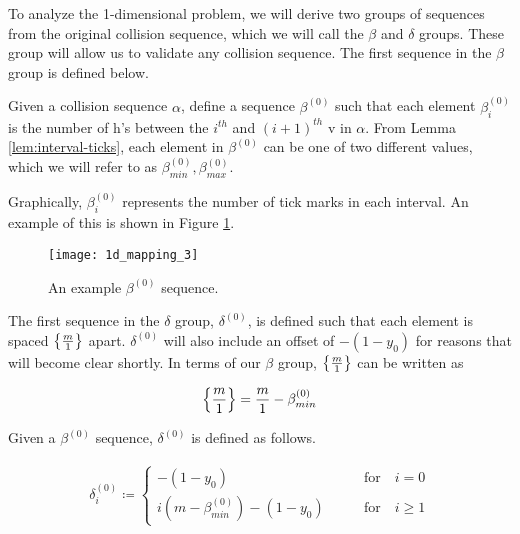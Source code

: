 
To analyze the 1-dimensional problem, we will derive two groups of sequences from the original collision sequence, which we will call the $\beta$ and $\delta$ groups. These group will allow us to validate any collision sequence. The first sequence in the $\beta$ group is defined below.

\begin{definition}
	Given a collision sequence $\alpha$, define a sequence $\beta^{(0)}$ such that each element $\beta^{(0)}_i$ is the number of h's between the $i^{th}$ and $(i+1)^{th}$ v in $\alpha$. From Lemma \ref{lem:interval-ticks}, each element in $\beta^{(0)}$ can be one of two different values, which we will refer to as $\beta^{(0)}_{min}, \beta^{(0)}_{max}$.
\end{definition}

Graphically, $\beta^{(0)}_i$ represents the number of tick marks in each interval. An example of this is shown in Figure \ref{fig:beta-sequence}.

\begin{figure}[H]
  \begin{center}
    \texttt{[image: 1d\_mapping\_3]}
  \end{center}
  \vspace{-.2in} %
  \caption{\label{fig:beta-sequence} An example $\beta^{(0)}$ sequence.}
\end{figure}

The first sequence in the $\delta$ group, $\delta^{(0)}$, is defined such that each element is spaced $\cbracket{\frac{m}{1}}$ apart. $\delta^{(0)}$ will also include an offset of $-(1-y_0)$ for reasons that will become clear shortly. In terms of our $\beta$ group, $\cbracket{\frac{m}{1}}$ can be written as 

\begin{equation}
  \cbracket{\frac{m}{1}} = \frac{m}{1} - \beta^{(0)}_{min}
\end{equation}

\begin{definition}
  Given a $\beta^{(0)}$ sequence, $\delta^{(0)}$ is defined as follows.

  \begin{align}\label{delta_beta}
    \delta^{(0)}_i \coloneqq \begin{cases}
      -(1-y_0) \qquad &\text{for} \quad i = 0\\
      i (m - \beta^{(0)}_{min}) - (1-y_0) \qquad &\text{for} \quad i \ge 1
    \end{cases}
  \end{align}
\end{definition}

